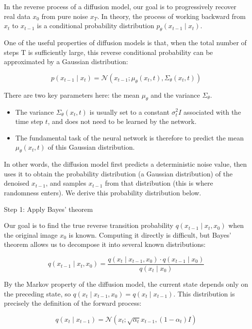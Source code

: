 In the reverse process of a diffusion model, our goal is to progressively recover real data \(x_0\) from pure noise \(x_T\). In theory, the process of working backward from \(x_t\) to \(x_{t-1}\) is a conditional probability distribution \(p_\theta(x_{t-1}\mid x_t)\).

One of the useful properties of diffusion models is that, when the total number of steps T is sufficiently large, this reverse conditional probability can be approximated by a Gaussian distribution:

\[
p(x_{t-1}\mid x_t)=\mathcal{N}(x_{t-1};\mu_\theta(x_t,t),\Sigma_\theta(x_t,t))
\]

There are two key parameters here: the mean \(\mu_\theta\) and the variance \(\Sigma_\theta\).

\begin{itemize}
\tightlist
\item
  The variance \(\Sigma_\theta(x_t,t)\) is usually set to a constant \(\sigma_t^2 I\) associated with the time step \(t\), and does not need to be learned by the network.
\item
  The fundamental task of the neural network is therefore to predict the mean \(\mu_\theta(x_t,t)\) of this Gaussian distribution.
\end{itemize}

In other words, the diffusion model first predicts a deterministic noise value, then uses it to obtain the probability distribution (a Gaussian distribution) of the denoised \(x_{t-1}\), and samples \(x_{t-1}\) from that distribution (this is where randomness enters). We derive this probability distribution below.

Step 1: Apply Bayes' theorem

Our goal is to find the true reverse transition probability \(q(x_{t-1}\mid x_t,x_0)\) when the original image \(x_0\) is known. Computing it directly is difficult, but Bayes' theorem allows us to decompose it into several known distributions:

\[
q(x_{t-1}\mid x_t,x_0)
= \frac{q(x_t\mid x_{t-1},x_0)\cdot q(x_{t-1}\mid x_0)}{q(x_t\mid x_0)}
\]

By the Markov property of the diffusion model, the current state depends only on the preceding state, so \(q(x_t\mid x_{t-1},x_0)=q(x_t\mid x_{t-1})\). This distribution is precisely the definition of the forward process:

\[
q(x_t\mid x_{t-1})=\mathcal{N}(x_t;\sqrt{\alpha_t}x_{t-1},(1-\alpha_t)I)
\]

